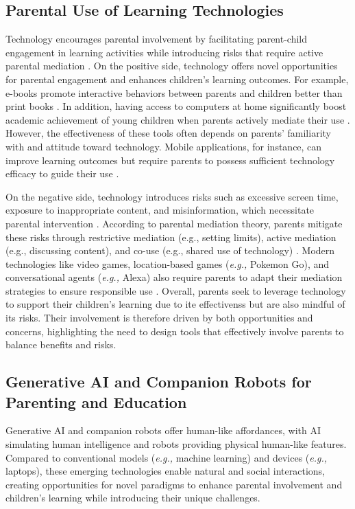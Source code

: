 \subsection{Parental Use of Learning Technologies}\label{sec-rw-2.2}
Technology encourages parental involvement by facilitating parent-child engagement in learning activities while introducing risks that require active parental mediation \cite{gonzalez2022parental}. On the positive side, technology offers novel opportunities for parental engagement and enhances children's learning outcomes. For example, e-books promote interactive behaviors between parents and children better than print books \cite{korat2010new}. In addition, having access to computers at home significantly boost academic achievement of young children when parents actively mediate their use \cite{hofferth2010home, espinosa2006technology}. However, the effectiveness of these tools often depends on parents' familiarity with and attitude toward technology. Mobile applications, for instance, can improve learning outcomes but require parents to possess sufficient technology efficacy to guide their use \cite{papadakis2019parental}.

On the negative side, technology introduces risks such as excessive screen time, exposure to inappropriate content, and misinformation, which necessitate parental intervention \cite{oswald2020psychological, howard2021digital}. According to parental mediation theory, parents mitigate these risks through restrictive mediation (e.g., setting limits), active mediation (e.g., discussing content), and co-use (e.g., shared use of technology) \cite{valkenburg1999developing}. Modern technologies like video games, location-based games (\textit{e.g.,} Pokemon Go), and conversational agents (\textit{e.g.,} Alexa) also require parents to adapt their mediation strategies to ensure responsible use \cite{valkenburg1999developing, nikken2006parental, sobel2017wasn, beneteau2020parenting, yu2024parent}. Overall, parents seek to leverage technology to support their children's learning due to ite effectivenss but are also mindful of its risks. Their involvement is therefore driven by both opportunities and concerns, highlighting the need to design tools that effectively involve parents to balance benefits and risks.

\subsection{Generative AI and Companion Robots for Parenting and Education}
Generative AI and companion robots offer human-like affordances, with AI simulating human intelligence and robots providing physical human-like features. Compared to conventional models (\textit{e.g.,} machine learning) and devices (\textit{e.g.,} laptops), these emerging technologies enable natural and social interactions, creating opportunities for novel paradigms to enhance parental involvement and children's learning while introducing their unique challenges.


